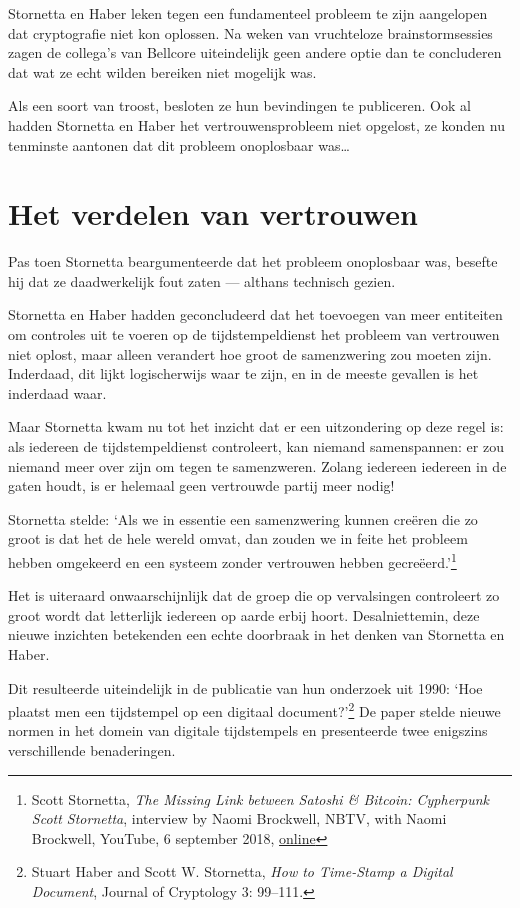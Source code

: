 \documentclass[
  a5paper,
  smalldemyvopaper,11pt,twoside,onecolumn,openright,extrafontsizes,
hidelinks]{memoir}
\begin{document}
Stornetta en Haber leken tegen een fundamenteel probleem te zijn
aangelopen dat cryptografie niet kon oplossen. Na weken van vruchteloze
brainstormsessies zagen de collega's van Bellcore uiteindelijk geen
andere optie dan te concluderen dat wat ze echt wilden bereiken niet
mogelijk was.

Als een soort van troost, besloten ze hun bevindingen te publiceren. Ook
al hadden Stornetta en Haber het vertrouwensprobleem niet opgelost, ze
konden nu tenminste aantonen dat dit probleem onoplosbaar was\ldots{}

\section{Het verdelen van vertrouwen}\label{het-verdelen-van-vertrouwen}

Pas toen Stornetta beargumenteerde dat het probleem onoplosbaar was,
besefte hij dat ze daadwerkelijk fout zaten --- althans technisch
gezien.

Stornetta en Haber hadden geconcludeerd dat het toevoegen van meer
entiteiten om controles uit te voeren op de tijdstempeldienst het
probleem van vertrouwen niet oplost, maar alleen verandert hoe groot de
samenzwering zou moeten zijn. Inderdaad, dit lijkt logischerwijs waar te
zijn, en in de meeste gevallen is het inderdaad waar.

Maar Stornetta kwam nu tot het inzicht dat er een uitzondering op deze
regel is: als iedereen de tijdstempeldienst controleert, kan niemand
samenspannen: er zou niemand meer over zijn om tegen te samenzweren.
Zolang iedereen iedereen in de gaten houdt, is er helemaal geen
vertrouwde partij meer nodig!

Stornetta stelde: `Als we in essentie een samenzwering kunnen creëren
die zo groot is dat het de hele wereld omvat, dan zouden we in feite het
probleem hebben omgekeerd en een systeem zonder vertrouwen hebben
gecreëerd.'\footnote{Scott Stornetta, \emph{The Missing Link between
  Satoshi \& Bitcoin: Cypherpunk Scott Stornetta}, interview by Naomi
  Brockwell, NBTV, with Naomi Brockwell, YouTube, 6 september 2018,
  \href{https://www.youtube.com/watch?v=fYr-keVOQ18}{online}}

Het is uiteraard onwaarschijnlijk dat de groep die op vervalsingen
controleert zo groot wordt dat letterlijk iedereen op aarde erbij hoort.
Desalniettemin, deze nieuwe inzichten betekenden een echte doorbraak in
het denken van Stornetta en Haber.

Dit resulteerde uiteindelijk in de publicatie van hun onderzoek uit
1990: `Hoe plaatst men een tijdstempel op een digitaal
document?'\footnote{Stuart Haber and Scott W. Stornetta, \emph{How to
  Time-Stamp a Digital Document}, Journal of Cryptology 3: 99--111.} De
paper stelde nieuwe normen in het domein van digitale tijdstempels en
presenteerde twee enigszins verschillende benaderingen.
\end{document}
